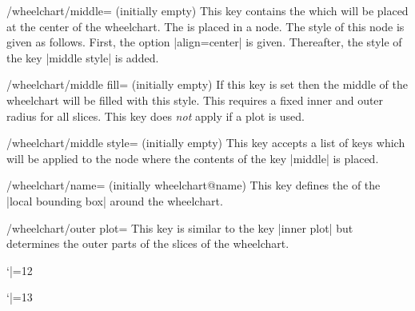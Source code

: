 \documentclass[a4paper,english,dvipsnames]{ltxdoc}
\begin{document}
\begin{key}{/wheelchart/middle= (initially \normalfont empty)}
This key contains the  which will be placed at the center of the wheelchart. The  is placed in a node. The style of this node is given as follows. First, the option |align=center| is given. Thereafter, the style of the key |middle style| is added.
\end{key}
\begin{stylekey}{/wheelchart/middle fill= (initially \normalfont empty)}
If this key is set then the middle of the wheelchart will be filled with this style. This requires a fixed inner and outer radius for all slices. This key does \emph{not} apply if a plot is used.
\end{stylekey}
\begin{stylekey}{/wheelchart/middle style= (initially \normalfont empty)}
This key accepts a list of keys which will be applied to the node where the contents of the key |middle| is placed.
\end{stylekey}
\begin{key}{/wheelchart/name= (initially wheelchart@name)}
This key defines the  of the |local bounding box| around the wheelchart.
\end{key}
\begin{key}{/wheelchart/outer plot=}
This key is similar to the key |inner plot| but determines the outer parts of the slices of the wheelchart.
\begin{codeexample}[]
\begin{tikzpicture}
\wheelchart[
  inner plot={{#1}:{#2+0.2*(cos(#1*\WCtotalcount)+1)}},
  outer plot={{#1}:{#2+0.2*(cos(#1*\WCtotalcount*2)+1)}}
]{\exampleforthismanual}
\end{tikzpicture}
\end{codeexample}
\catcode`|=12%
\begin{codeexample}[preamble={\usetikzlibrary{decorations.text}}]
\begin{tikzpicture}
\wheelchart[
  arc data=slice \WCcount\\|\bfseries|\WCvarC,
  arc data expand=f,
  arc data pos=0.5,
  arc data line sep factor=1.5,
  data=,
  domain=0:450,
  inner plot={
    {int((#1)/180)*5+(0.5-((-1)^Mod(int((#1)/180),2))*2.5)*cos(#1)},
    {(2.5-((-1)^Mod(int((#1)/180),2))*0.5)*sin(#1)}
  },
  outer plot={
    {int((#1)/180)*5+(-0.5-((-1)^Mod(int((#1)/180),2))*2.5)*cos(#1)},
    {(2.5+((-1)^Mod(int((#1)/180),2))*0.5)*sin(#1)}
  },
  value=width("\WCvarC")
]{\exampleforthismanual}
\end{tikzpicture}
\end{codeexample}
\catcode`|=13%
\end{key}
\end{document}
